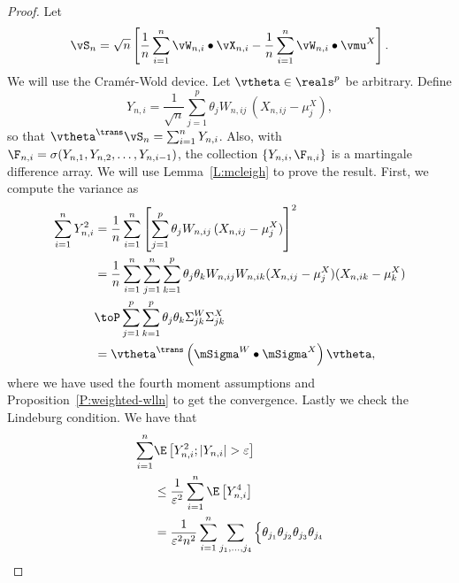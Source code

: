 \begin{proof}
    Let
    \[
        \vS_n
        =
        \sqrt{n} \left[ \frac{1}{n} \sum_{i=1}^n \vW_{n,i} \bullet \vX_{n,i}
            - \frac{1}{n} \sum_{i=1}^n \vW_{n,i} \bullet \vmu^X\right].
    \]
    We will use the Cram\'er-Wold device.  Let $\vtheta \in \reals^p$ be
    arbitrary.  Define
    \[
        Y_{n,i} 
        = 
        \frac{1}{\sqrt{n}}
        \sum_{j=1}^p
            \theta_j W_{n,ij} \, (X_{n,ij} - \mu^X_j),
    \]
    so that $\vtheta^\trans \vS_n = \sum_{i=1}^n Y_{n,i}$.  Also, with
    $\F_{n,i} = \sigma( Y_{n,1}, Y_{n,2}, \ldots, Y_{n,i-1})$, the collection
    $\{ Y_{n,i}, \F_{n,i} \}$ is a martingale difference array.  We will
    use Lemma~\ref{L:mcleigh} to prove the result.  First, we compute
    the variance as
    \begin{align*}
        \sum_{i=1}^n Y_{n,i}^2
        &=  \frac{1}{n}
            \sum_{i=1}^n
            \left[
                \sum_{j=1}^p
                    \theta_j W_{n,ij} \, (X_{n,ij} - \mu^X_j) 
            \right]^2 \\
        &=  \frac{1}{n}
            \sum_{i=1}^n
            \sum_{j=1}^n
            \sum_{k=1}^p
                \theta_j \theta_k
                W_{n,ij} W_{n,ik}
                (X_{n,ij} - \mu^X_j) (X_{n,ik} - \mu^X_k) \\
        &\toP \sum_{j=1}^p \sum_{k=1}^p
              \theta_j \theta_k
              \Sigma^W_{jk} \Sigma^X_{jk} \\
        &= \vtheta^\trans 
           \left(
               \mSigma^W
               \bullet
               \mSigma^X
           \right)
           \vtheta,
    \end{align*}
    where we have used  the fourth moment assumptions and
    Proposition~\ref{P:weighted-wlln} to get the convergence.  Lastly we check 
    the Lindeburg condition.  We have that
    \begin{align*}
        \sum_{i=1}^n
            &\E \left[ 
                Y_{n,i}^2 ; | Y_{n,i} | > \varepsilon
            \right] \\
        &\leq
            \frac{1}{\varepsilon^2}
            \sum_{i=1}^n
            \E \left[ 
                Y_{n,i}^4
            \right] \\
        &=
            \frac{1}{\varepsilon^2 n^2}
            \sum_{i=1}^n
            \sum_{j_1, \ldots, j_4}
                \Big\{
                 \theta_{j_1}
                 \theta_{j_2}
                 \theta_{j_3}
                 \theta_{j_4} 

\end{align*}
\end{proof}
